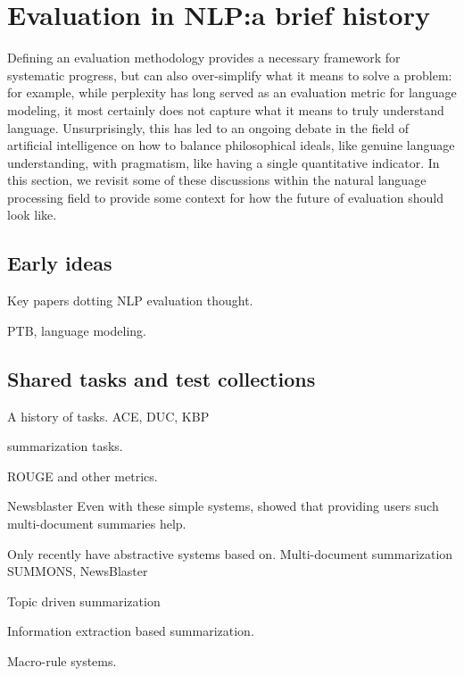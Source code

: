 \section{\label{sec:setup:history}Evaluation in NLP:\@ a brief history}

Defining an evaluation methodology provides a necessary framework for systematic progress, but can also over-simplify what it means to solve a problem: for example, while perplexity has long served as an evaluation metric for language modeling, it most certainly does not capture what it means to truly understand language.
Unsurprisingly, this has led to an ongoing debate in the field of artificial intelligence on how to balance philosophical ideals, like genuine language understanding, with pragmatism, like having a single quantitative indicator.
In this section, we revisit some of these discussions within the natural language processing field to provide some context for how the future of evaluation should look like.

\subsection{Early ideas}
Key papers dotting NLP evaluation thought.

PTB, language modeling.


\subsection{Shared tasks and test collections}
A history of tasks.
ACE, DUC, KBP

summarization tasks.



ROUGE and other metrics.


Newsblaster
Even with these simple systems, \citet{mckeown2005summaries} showed that providing users such multi-document summaries help.

Only recently have abstractive systems based on.
Multi-document summarization SUMMONS, NewsBlaster

Topic driven summarization

Information extraction based summarization.


Macro-rule systems.

